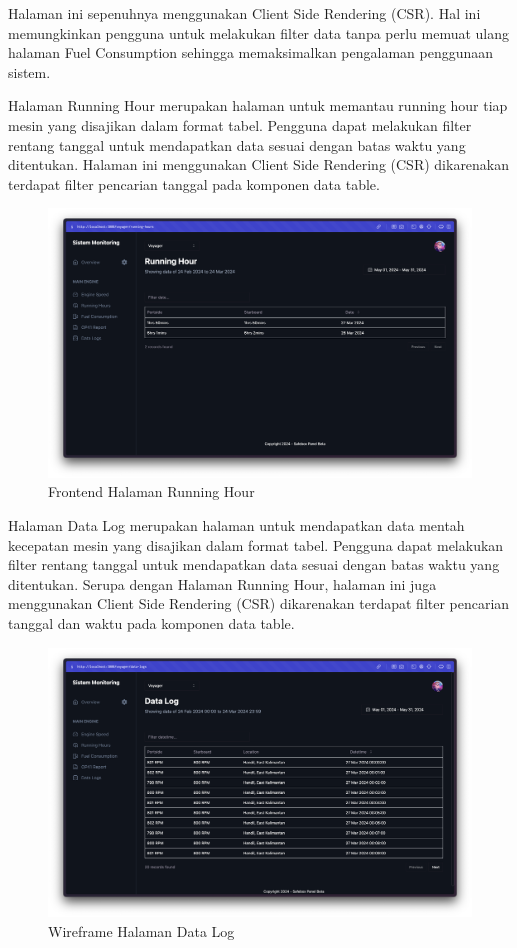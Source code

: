 Halaman ini sepenuhnya menggunakan Client Side Rendering (CSR). Hal
ini memungkinkan pengguna untuk melakukan filter data tanpa perlu memuat ulang
halaman Fuel Consumption sehingga memaksimalkan pengalaman penggunaan sistem.

\newpage

Halaman Running Hour merupakan halaman untuk memantau running hour tiap mesin yang disajikan dalam format tabel. Pengguna dapat melakukan filter rentang tanggal untuk mendapatkan data sesuai dengan batas waktu yang ditentukan. Halaman ini menggunakan Client Side Rendering (CSR) dikarenakan terdapat filter pencarian tanggal pada komponen data table.

\begin{figure}[!h]
    \includegraphics[width=1.05\linewidth, center]{images/hasil/iterations/2/fe-rh.png}
    \caption{Frontend Halaman Running Hour}
    \label{fig:fe-rh}
\end{figure}

Halaman Data Log merupakan halaman untuk mendapatkan data mentah kecepatan mesin yang disajikan dalam format tabel. Pengguna dapat melakukan filter rentang tanggal untuk mendapatkan data sesuai dengan batas waktu yang ditentukan. Serupa dengan Halaman Running Hour, halaman ini juga menggunakan Client Side Rendering (CSR) dikarenakan terdapat filter pencarian tanggal dan waktu pada komponen data table.

\begin{figure}[!h]
    \includegraphics[width=1.05\linewidth, center]{images/hasil/iterations/2/fe-dl.png}
    \caption{Wireframe Halaman Data Log}
    \label{fig:fe-dl}
\end{figure}

